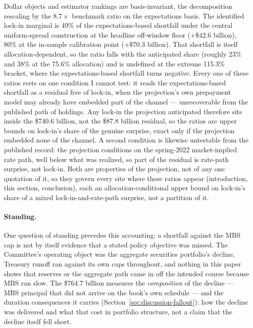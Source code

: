 Dollar objects and estimator rankings are basis-invariant, the decomposition rescaling by the $8.7\times$ benchmark ratio on the expectations basis. The identified lock-in marginal is 49\% of the expectations-based shortfall under the central uniform-spread construction at the headline off-window floor ($+\$42.6$ billion), 80\% at the in-sample calibration point ($+\$70.3$ billion). That shortfall is itself allocation-dependent, so the ratio falls with the anticipated share (roughly 23\% and 38\% at the 75.6\% allocation) and is undefined at the extreme 115.3\% bracket, where the expectations-based shortfall turns negative. Every one of these ratios rests on one condition I cannot test: it reads the expectations-based shortfall as a residual free of lock-in, when the projection's own prepayment model may already have embedded part of the channel --- unrecoverable from the published path of holdings. Any lock-in the projection anticipated therefore sits inside the \$740.6 billion, not the \$87.8 billion residual, so the ratios are upper bounds on lock-in's share of the genuine surprise, exact only if the projection embedded none of the channel. A second condition is likewise untestable from the published record: the projection conditions on the spring-2022 market-implied rate path, well below what was realized, so part of the residual is rate-path surprise, not lock-in. Both are properties of the projection, not of any one quotation of it, so they govern every site where these ratios appear (introduction, this section, conclusion), each an allocation-conditional upper bound on lock-in's share of a mixed lock-in-and-rate-path surprise, not a partition of it.

\paragraph{Standing.} One question of standing precedes this accounting: a shortfall against the MBS cap is not by itself evidence that a stated policy objective was missed. The Committee's operating object was the aggregate securities portfolio's decline, Treasury runoff ran against its own caps throughout, and nothing in this paper shows that reserves or the aggregate path came in off the intended course because MBS ran slow. The \$764.7 billion measures the \emph{composition} of the decline --- MBS principal that did not arrive on the book's own schedule --- and the duration consequences it carries (Section~\ref{sec:discussion-fallout}): how the decline was delivered and what that cost in portfolio structure, not a claim that the decline itself fell short.

